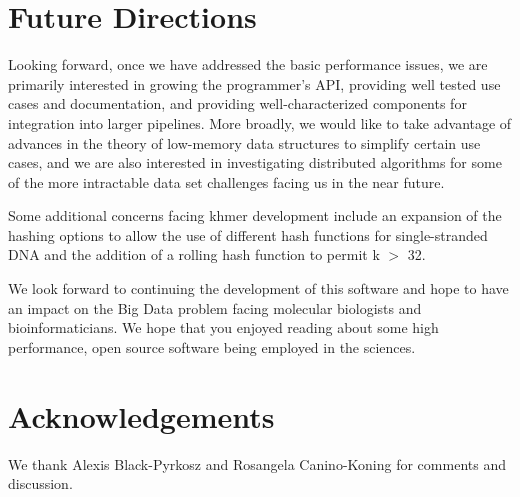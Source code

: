\documentclass{article}
\begin{document}
\section{Future Directions}

Looking forward, once we have addressed the basic performance issues,
we are primarily interested in growing the programmer's API, providing
well tested use cases and documentation, and providing well-characterized
components for integration into larger pipelines. More broadly, we would like
to take advantage of advances in the theory of low-memory data structures to
simplify certain use cases, and we are also interested in investigating
distributed algorithms for some of the more intractable data set challenges
facing us in the near future.

Some additional concerns facing khmer development include an expansion
of the hashing options to allow the use of different hash functions
for single-stranded DNA and the addition of a rolling hash function to
permit k $>$ 32.

We look forward to continuing the development of this software and
hope to have an impact on the Big Data problem facing molecular
biologists and bioinformaticians. We hope that you enjoyed reading
about some high performance, open source software being employed in
the sciences.

\section{Acknowledgements}

We thank Alexis Black-Pyrkosz and Rosangela Canino-Koning for comments and
discussion.



\end{document}
